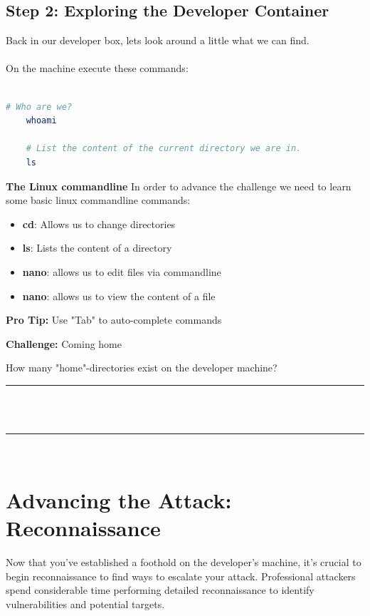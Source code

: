 \documentclass[12pt]{scrartcl}
\newenvironment{hintbox}{%
    \def\FrameCommand{\fboxsep=\FrameSep\colorbox{hintgreen!20}}%
    \MakeFramed {\advance\hsize-\width \FrameRestore}}%
    {\endMakeFramed}
\newenvironment{challengebox}[1]{%
    \def\FrameCommand{\fboxsep=\FrameSep\colorbox{flagblue!10}}%
    \MakeFramed{\advance\hsize-\width \FrameRestore}
    \noindent\textbf{Challenge:} #1\\[0.5em]
    \vspace{0.5em}
    \begin{minipage}{0.95\linewidth}
    }{%
    \\[1em]
    \noindent\rule{\linewidth}{0.4pt}\\[2em] %
    \end{minipage}
    \endMakeFramed
    }
\begin{document}
    \subsection{Step 2: Exploring the Developer Container}

    Back in our developer box, lets look around a little what we can find. \\
    \\
    On the machine execute these commands: \\
    \\
    \begin{lstlisting}[language=bash, caption=Exploring the filesystem]
    # Who are we?
    whoami

    # List the content of the current directory we are in.
    ls

    \end{lstlisting}

    \begin{hintbox}
    \noindent
    \textbf{The Linux commandline}
    \noindent
    In order to advance the challenge we need to learn some basic linux commandline commands:
    \begin{itemize}
        \item \textbf{cd}: Allows us to change directories 
        \item \textbf{ls}: Lists the content of a directory 
        \item \textbf{nano}: allows us to edit files via commandline 
        \item \textbf{nano}: allows us to view the content of a file
    \end{itemize}

    \noindent
    \textbf{Pro Tip:} Use "Tab" to auto-complete commands 
    \end{hintbox}

    \begin{challengebox}{Coming home}
    How many "home"-directories exist on the developer machine?
    \noindent\rule{\linewidth}{0.4pt}\\[2em]
    \end{challengebox}

    \newpage

    \section{Advancing the Attack: Reconnaissance}

    Now that you've established a foothold on the developer's machine, it's crucial to begin reconnaissance to find ways to escalate your attack. Professional attackers spend considerable time performing detailed reconnaissance to identify vulnerabilities and potential targets.
\end{document}
